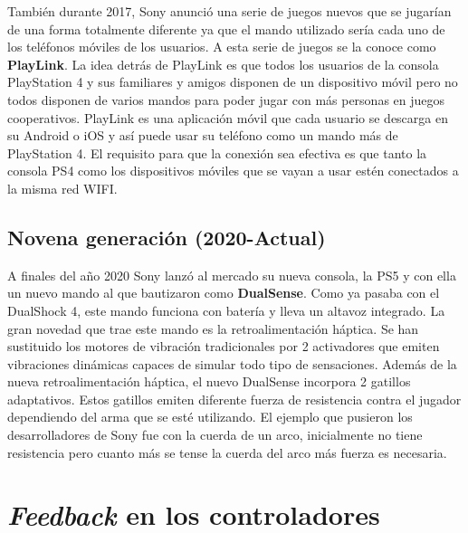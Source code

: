 Tambi\'en durante 2017, Sony anunci\'o una serie de juegos nuevos que se jugar\'ian de una forma totalmente diferente ya que el mando utilizado ser\'ia cada uno de los tel\'efonos m\'oviles de los usuarios. A esta serie de juegos se la conoce como \textbf{PlayLink}. La idea detr\'as de PlayLink es que todos los usuarios de la consola PlayStation 4 y sus familiares y amigos disponen de un dispositivo m\'ovil pero no todos disponen de varios mandos para poder jugar con m\'as personas en juegos cooperativos. PlayLink es una aplicaci\'on m\'ovil que cada usuario se descarga en su Android o iOS y as\'i puede usar su tel\'efono como un mando m\'as de PlayStation 4. El requisito para que la conexi\'on sea efectiva es que tanto la consola PS4 como los dispositivos m\'oviles que se vayan a usar est\'en conectados a la misma red WIFI.\\

\subsection{Novena generaci\'on (2020-Actual)}

A finales del a\~no 2020 Sony lanz\'o al mercado su nueva consola, la PS5 y con ella un nuevo mando al que bautizaron como \textbf{DualSense}. Como ya pasaba con el DualShock 4, este mando funciona con bater\'ia y lleva un altavoz integrado. La gran novedad que trae este mando es la retroalimentaci\'on h\'aptica. Se han sustituido los motores de vibraci\'on tradicionales por 2 activadores que emiten vibraciones din\'amicas capaces de simular todo tipo de sensaciones. Adem\'as de la nueva retroalimentaci\'on h\'aptica, el nuevo DualSense incorpora 2 gatillos adaptativos. Estos gatillos emiten diferente fuerza de resistencia contra el jugador dependiendo del arma que se est\'e utilizando. El ejemplo que pusieron los desarrolladores de Sony fue con la cuerda de un arco, inicialmente no tiene resistencia pero cuanto m\'as se tense la cuerda del arco m\'as fuerza es necesaria.

\section{\textit{Feedback} en los controladores}

